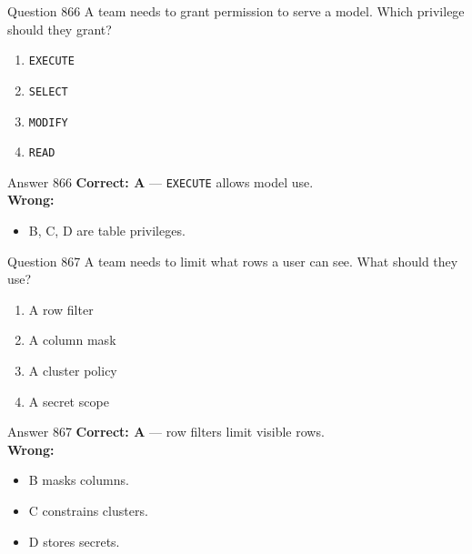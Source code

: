 \documentclass[aspectratio=169,11pt]{beamer}
\begin{document}
	\begin{frame}{Question 866}
		A team needs to grant permission to serve a model. Which privilege should they grant?
		\begin{enumerate}[label=\Alph*.]
			\item \texttt{EXECUTE}
			\item \texttt{SELECT}
			\item \texttt{MODIFY}
			\item \texttt{READ}
		\end{enumerate}
	\end{frame}
	\begin{frame}{Answer 866}
		\textbf{Correct: A} --- \texttt{EXECUTE} allows model use.\\
		\vspace{0.5em}
		\textbf{Wrong:}
		\begin{itemize}
			\item B, C, D are table privileges.
		\end{itemize}
	\end{frame}
	
	\begin{frame}{Question 867}
		A team needs to limit what rows a user can see. What should they use?
		\begin{enumerate}[label=\Alph*.]
			\item A row filter
			\item A column mask
			\item A cluster policy
			\item A secret scope
		\end{enumerate}
	\end{frame}
	\begin{frame}{Answer 867}
		\textbf{Correct: A} --- row filters limit visible rows.\\
		\vspace{0.5em}
		\textbf{Wrong:}
		\begin{itemize}
			\item B masks columns.
			\item C constrains clusters.
			\item D stores secrets.
		\end{itemize}
	\end{frame}
	
\end{document}
